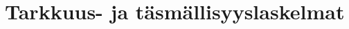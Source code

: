 \chapter{Tarkkuus- ja täsmällisyyslaskelmat}\label{appx:tarkkuus}
\setcounter{table}{0}
%
%
\def\matala{\cellcolor[RGB]{99,190,123}50}
\def\keski{\cellcolor[RGB]{255,235,132}500}
\def\korkea{\cellcolor[RGB]{248,105,107}1000}

\def\matalab{\cellcolor[RGB]{99,190,123}100}
\def\keskib{\cellcolor[RGB]{255,235,132}750}
\def\korkeab{\cellcolor[RGB]{248,105,107}1500}

\def\matalac{\cellcolor[RGB]{99,190,123}200}
\def\keskic{\cellcolor[RGB]{255,235,132}1000}
\def\korkeac{\cellcolor[RGB]{248,105,107}2000}

